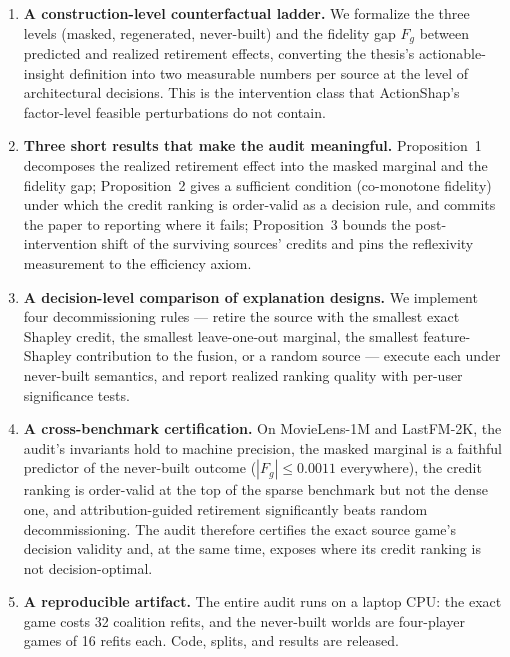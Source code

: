 \documentclass[pdflatex,sn-mathphys-num]{sn-jnl}
\theoremstyle{thmstyleone}%
\theoremstyle{thmstyletwo}%
\theoremstyle{thmstylethree}%
\begin{document}
\begin{enumerate}
\item \textbf{A construction-level counterfactual ladder.} We formalize the three levels (masked, regenerated, never-built) and the fidelity gap $F_g$ between predicted and realized retirement effects, converting the thesis's actionable-insight definition into two measurable numbers per source at the level of architectural decisions. This is the intervention class that ActionShap's factor-level feasible perturbations do not contain.

\item \textbf{Three short results that make the audit meaningful.} Proposition~1 decomposes the realized retirement effect into the masked marginal and the fidelity gap; Proposition~2 gives a sufficient condition (co-monotone fidelity) under which the credit ranking is order-valid as a decision rule, and commits the paper to reporting where it fails; Proposition~3 bounds the post-intervention shift of the surviving sources' credits and pins the reflexivity measurement to the efficiency axiom.

\item \textbf{A decision-level comparison of explanation designs.} We implement four decommissioning rules --- retire the source with the smallest exact Shapley credit, the smallest leave-one-out marginal, the smallest feature-Shapley contribution to the fusion, or a random source --- execute each under never-built semantics, and report realized ranking quality with per-user significance tests.

\item \textbf{A cross-benchmark certification.} On MovieLens-1M and LastFM-2K, the audit's invariants hold to machine precision, the masked marginal is a faithful predictor of the never-built outcome ($|F_g| \leq 0.0011$ everywhere), the credit ranking is order-valid at the top of the sparse benchmark but not the dense one, and attribution-guided retirement significantly beats random decommissioning. The audit therefore certifies the exact source game's decision validity and, at the same time, exposes where its credit ranking is not decision-optimal.

\item \textbf{A reproducible artifact.} The entire audit runs on a laptop CPU: the exact game costs 32 coalition refits, and the never-built worlds are four-player games of 16 refits each. Code, splits, and results are released.
\end{enumerate}
\end{document}
